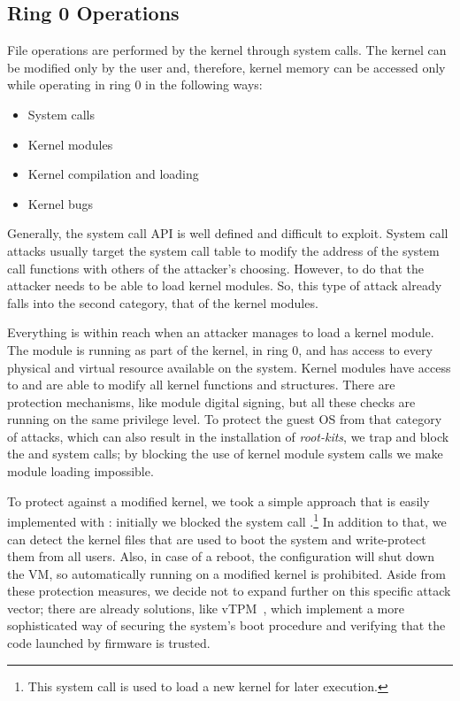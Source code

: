\subsection{Ring 0 Operations}\label{sub:ring0}

\par File operations are performed by the kernel through system calls. The kernel can be modified only by the  user and, therefore, kernel memory can be accessed only while operating in ring 0 in the following ways:

\begin{itemize}
	\item System calls
	\item Kernel modules
	\item Kernel compilation and loading
	\item Kernel bugs
\end{itemize}

\par Generally, the system call \ac{API} is well defined and difficult to exploit. System call attacks usually target the system call table to modify the address of the system call functions with others of the attacker's choosing. However, to do that the attacker needs to be able to load kernel modules. So, this type of attack already falls into the second category, that of the kernel modules.

\par Everything is within reach when an attacker manages to load a kernel module. The module is running as part of the kernel, in ring 0, and has access to every physical and virtual resource available on the system. Kernel modules have access to and are able to modify all kernel functions and structures. There are protection mechanisms, like module digital signing, but all these checks are running on the same privilege level. To protect the guest \ac{OS} from that category
of attacks, which can also result in the installation of \emph{root-kits}, we trap and block the  and  system calls;
by blocking the use of kernel module system calls we make module loading impossible.

\par To protect against a modified kernel, we took a simple approach that is easily implemented with : initially we blocked the system call .\footnote{This system call is used to load a new kernel for later execution.} In addition to that, we can detect the kernel files that are used to boot the system and write-protect them from all users. Also, in case of a reboot, the configuration will shut down the \ac{VM}, so automatically running on a modified kernel is prohibited. Aside from these protection measures, we decide not to expand further on this specific attack vector; there are already solutions, like vTPM~\cite{perez2006vtpm}, which implement a more sophisticated way of securing the system's boot procedure and verifying that the code launched by firmware is trusted. 

